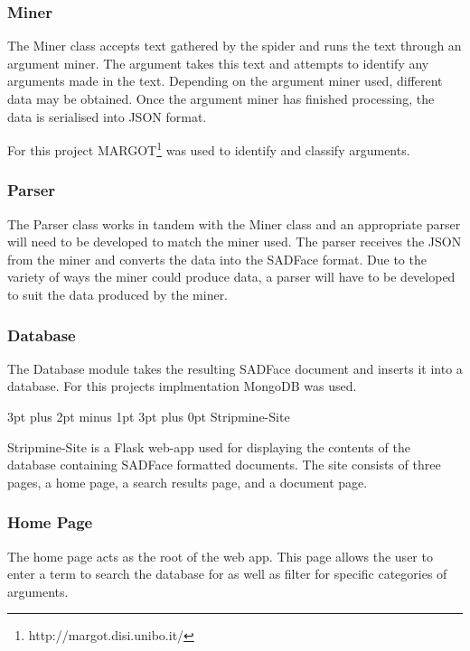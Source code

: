 \documentclass[12pt,a4paper]{article}
\makeatletter
\renewcommand\subsection{\@startsection {subsection}{1}{2mm} %
                               {3pt plus 2pt minus 1pt} %
                               {3pt plus 0pt} %
                               {\normalfont\bfseries}}
\makeatother
\begin{document}
\subsubsection{Miner}

The Miner class accepts text gathered by the spider and runs the text through an argument miner. The argument takes this text and attempts to identify any arguments made in the text. Depending on the argument miner used, different data may be obtained. Once the argument miner has finished processing, the data is serialised into JSON format.

For this project MARGOT\footnote{http://margot.disi.unibo.it/} was used to identify and classify arguments.

\subsubsection{Parser}

The Parser class works in tandem with the Miner class and an appropriate parser will need to be developed to match the miner used. The parser receives the JSON from the miner and converts the data into the SADFace format. Due to the variety of ways the miner could produce data, a parser will have to be developed to suit the data produced by the miner.

\subsubsection{Database}

The Database module takes the resulting SADFace document and inserts it into a database. For this projects implmentation MongoDB was used.

\subsection{Stripmine-Site}

Stripmine-Site is a Flask web-app used for displaying the contents of the database containing SADFace formatted documents. The site consists of three pages, a home page, a search results page, and a document page.

\subsubsection{Home Page}

The home page acts as the root of the web app. This page allows the user to enter a term to search the database for as well as filter for specific categories of arguments.
\end{document}
